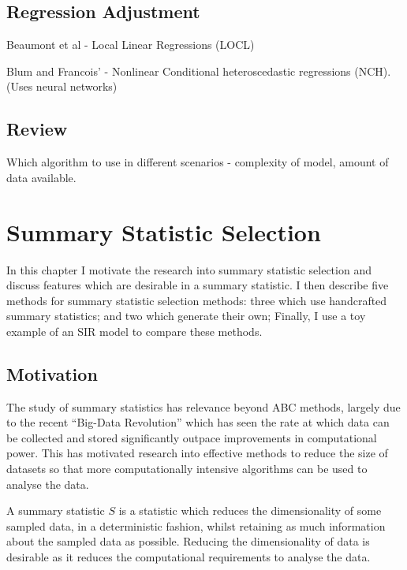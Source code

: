 \documentclass[11pt,a4paper,margin=0]{article}
\theoremstyle{break}
\begin{document}
\subsection*{Regression Adjustment}

  \par Beaumont et al - Local Linear Regressions (LOCL)
  \par Blum and Francois' - Nonlinear Conditional heteroscedastic regressions (NCH). (Uses neural networks)

\subsection*{Review}\label{sec_ABC_review}

  Which algorithm to use in different scenarios - complexity of model, amount of data available.

\newpage
\section{Summary Statistic Selection}\label{sec_summary_stats}

  In this chapter I motivate the research into summary statistic selection and discuss features which are desirable in a summary statistic. I then describe five methods for summary statistic selection methods: three which use handcrafted summary statistics; and two which generate their own; Finally, I use a toy example of an SIR model to compare these methods.

\subsection*{Motivation}\label{sec_summary_stats_motivation}

  The study of summary statistics has relevance beyond ABC methods, largely due to the recent ``Big-Data Revolution'' which has seen the rate at which data can be collected and stored significantly outpace improvements in computational power. This has motivated research into effective methods to reduce the size of datasets so that more computationally intensive algorithms can be used to analyse the data. %

  \par A summary statistic $S$ is a statistic which reduces the dimensionality of some sampled data, in a deterministic fashion, whilst retaining as much information about the sampled data as possible. Reducing the dimensionality of data is desirable as it reduces the computational requirements to analyse the data.
\end{document}
